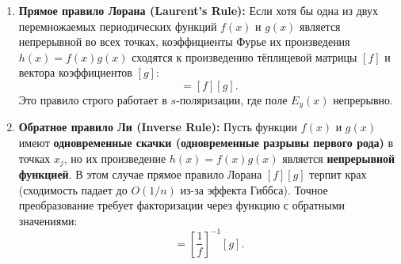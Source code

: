\documentclass[a4paper,11pt]{article}
\begin{document}
\begin{enumerate}
    \item \textbf{Прямое правило Лорана (Laurent's Rule):}
    Если хотя бы одна из двух перемножаемых периодических функций $f(x)$ и $g(x)$ является непрерывной во всех точках, коэффициенты Фурье их произведения $h(x) = f(x) g(x)$ сходятся к произведению тёплицевой матрицы $[f]$ и вектора коэффициентов $[g]$:
    \begin{equation}
        [h] = [f] [g].
    \end{equation}
    Это правило строго работает в $s$-поляризации, где поле $E_y(x)$ непрерывно.

    \item \textbf{Обратное правило Ли (Inverse Rule):}
    Пусть функции $f(x)$ и $g(x)$ имеют \textbf{одновременные скачки (одновременные разрывы первого рода)} в точках $x_j$, но их произведение $h(x) = f(x) g(x)$ является \textbf{непрерывной функцией}.
    В этом случае прямое правило Лорана $[f][g]$ терпит крах (сходимость падает до $O(1/n)$ из-за эффекта Гиббса). Точное преобразование требует факторизации через функцию с обратными значениями:
    \begin{equation}
        [h] = \left[ \frac{1}{f} \right]^{-1} [g].
        \label{eq:li_inverse_rule}
    \end{equation}
\end{enumerate}
\end{document}
